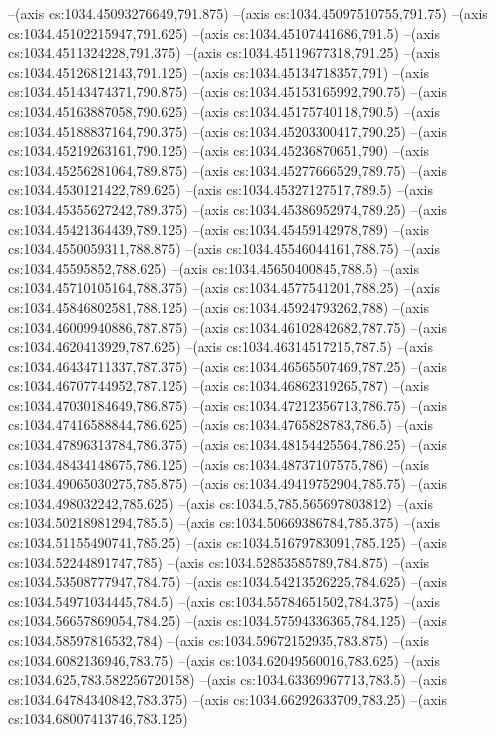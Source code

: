 --(axis cs:1034.45093276649,791.875)
--(axis cs:1034.45097510755,791.75)
--(axis cs:1034.45102215947,791.625)
--(axis cs:1034.45107441686,791.5)
--(axis cs:1034.4511324228,791.375)
--(axis cs:1034.45119677318,791.25)
--(axis cs:1034.45126812143,791.125)
--(axis cs:1034.45134718357,791)
--(axis cs:1034.45143474371,790.875)
--(axis cs:1034.45153165992,790.75)
--(axis cs:1034.45163887058,790.625)
--(axis cs:1034.45175740118,790.5)
--(axis cs:1034.45188837164,790.375)
--(axis cs:1034.45203300417,790.25)
--(axis cs:1034.45219263161,790.125)
--(axis cs:1034.45236870651,790)
--(axis cs:1034.45256281064,789.875)
--(axis cs:1034.45277666529,789.75)
--(axis cs:1034.4530121422,789.625)
--(axis cs:1034.45327127517,789.5)
--(axis cs:1034.45355627242,789.375)
--(axis cs:1034.45386952974,789.25)
--(axis cs:1034.45421364439,789.125)
--(axis cs:1034.45459142978,789)
--(axis cs:1034.4550059311,788.875)
--(axis cs:1034.45546044161,788.75)
--(axis cs:1034.45595852,788.625)
--(axis cs:1034.45650400845,788.5)
--(axis cs:1034.45710105164,788.375)
--(axis cs:1034.4577541201,788.25)
--(axis cs:1034.45846802581,788.125)
--(axis cs:1034.45924793262,788)
--(axis cs:1034.46009940886,787.875)
--(axis cs:1034.46102842682,787.75)
--(axis cs:1034.4620413929,787.625)
--(axis cs:1034.46314517215,787.5)
--(axis cs:1034.46434711337,787.375)
--(axis cs:1034.46565507469,787.25)
--(axis cs:1034.46707744952,787.125)
--(axis cs:1034.46862319265,787)
--(axis cs:1034.47030184649,786.875)
--(axis cs:1034.47212356713,786.75)
--(axis cs:1034.47416588844,786.625)
--(axis cs:1034.4765828783,786.5)
--(axis cs:1034.47896313784,786.375)
--(axis cs:1034.48154425564,786.25)
--(axis cs:1034.48434148675,786.125)
--(axis cs:1034.48737107575,786)
--(axis cs:1034.49065030275,785.875)
--(axis cs:1034.49419752904,785.75)
--(axis cs:1034.498032242,785.625)
--(axis cs:1034.5,785.565697803812)
--(axis cs:1034.50218981294,785.5)
--(axis cs:1034.50669386784,785.375)
--(axis cs:1034.51155490741,785.25)
--(axis cs:1034.51679783091,785.125)
--(axis cs:1034.52244891747,785)
--(axis cs:1034.52853585789,784.875)
--(axis cs:1034.53508777947,784.75)
--(axis cs:1034.54213526225,784.625)
--(axis cs:1034.54971034445,784.5)
--(axis cs:1034.55784651502,784.375)
--(axis cs:1034.56657869054,784.25)
--(axis cs:1034.57594336365,784.125)
--(axis cs:1034.58597816532,784)
--(axis cs:1034.59672152935,783.875)
--(axis cs:1034.6082136946,783.75)
--(axis cs:1034.62049560016,783.625)
--(axis cs:1034.625,783.582256720158)
--(axis cs:1034.63369967713,783.5)
--(axis cs:1034.64784340842,783.375)
--(axis cs:1034.66292633709,783.25)
--(axis cs:1034.68007413746,783.125)
